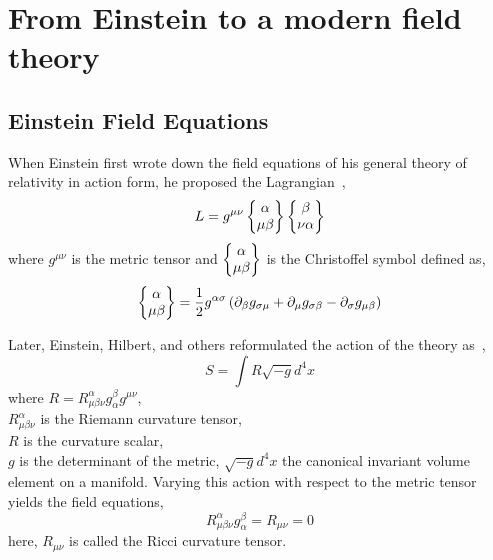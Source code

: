 \documentclass[aps,prd,preprint]{revtex4-1}
\begin{document}
\section{From Einstein to a modern field theory}
\subsection*{Einstein Field Equations}
When Einstein first wrote down the field equations of his general theory of relativity in action form, he proposed the Lagrangian~\cite{Einstein_1915,Einstein_1916},
\begin{equation}\label{Einstein_1915}
    L = g^{\mu\nu} \left\{ \begin{matrix} \alpha \\ \mu \beta \end{matrix} \right\} \left\{ \begin{matrix} \beta \\ \nu \alpha \end{matrix} \right\}
\end{equation}
where $g^{\mu\nu}$ is the metric tensor and $\left\{ \begin{matrix} \alpha \\ \mu \beta \end{matrix} \right\}$ is the Christoffel symbol defined as,
\begin{equation}\label{christoffel}
    \left\{ \begin{matrix} \alpha \\ \mu \beta \end{matrix} \right\} = \frac{1}{2} g^{\alpha\sigma} \left(\partial_{\beta}g_{\sigma\mu} + \partial_{\mu}g_{\sigma\beta} - \partial_{\sigma}g_{\mu\beta}\right)
\end{equation}

Later, Einstein, Hilbert, and others reformulated the action of the theory as~\cite{Hilbert_1915,misner_2017},
\begin{equation}\label{Einstein-Hilbert_action}
    S=\int{R \sqrt{-g} d^4x}
\end{equation}
where $R = R^{\alpha}_{\mu\beta\nu}g^{\beta}_{\alpha}g^{\mu\nu}$, \\
$R^{\alpha}_{\mu\beta\nu}$ is the Riemann curvature tensor, \\
$R$ is the curvature scalar, \\
$g$ is the determinant of the metric, $\sqrt{-g} d^4x$ the canonical invariant volume element on a manifold.
Varying this action with respect to the metric tensor yields the field equations,
\begin{equation}\label{EFEs}
    R^{\alpha}_{\mu\beta\nu}g^{\beta}_{\alpha} = R_{\mu\nu} = 0
\end{equation}
here, $R_{\mu\nu}$ is called the Ricci curvature tensor.
\end{document}
